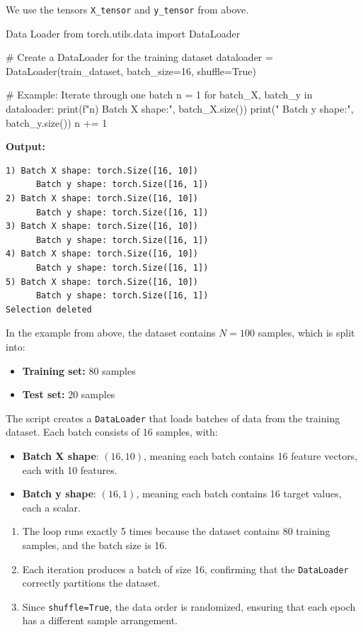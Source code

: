 We use the tensors \texttt{X\_tensor} and \texttt{y\_tensor} from above. 

\begin{codeonly}{Data Loader}
from torch.utils.data import DataLoader

# Create a DataLoader for the training dataset
dataloader = DataLoader(train_dataset, batch_size=16, shuffle=True)

# Example: Iterate through one batch
n = 1
for batch_X, batch_y in dataloader:
    print(f"{n}) Batch X shape:", batch_X.size())
    print("      Batch y shape:", batch_y.size())
    n += 1
\end{codeonly}


\textbf{Output:}
\begin{lstlisting}
1) Batch X shape: torch.Size([16, 10])
      Batch y shape: torch.Size([16, 1])
2) Batch X shape: torch.Size([16, 10])
      Batch y shape: torch.Size([16, 1])
3) Batch X shape: torch.Size([16, 10])
      Batch y shape: torch.Size([16, 1])
4) Batch X shape: torch.Size([16, 10])
      Batch y shape: torch.Size([16, 1])
5) Batch X shape: torch.Size([16, 10])
      Batch y shape: torch.Size([16, 1])
Selection deleted
\end{lstlisting}
%


In the example from above, the dataset contains $N = 100$ samples, which is split into:
\begin{itemize}
    \item \textbf{Training set:} 80 samples
    \item \textbf{Test set:} 20 samples
\end{itemize}
The script creates a \texttt{DataLoader} that loads batches of data from the training dataset. Each batch consists of 16 samples, with:
\begin{itemize}
    \item \textbf{Batch X shape}: $(16,10)$, meaning each batch contains 16 feature vectors, each with 10 features.
    \item \textbf{Batch y shape}: $(16,1)$, meaning each batch contains 16 target values, each a scalar.
\end{itemize}

\begin{enumerate}
    \item The loop runs exactly 5 times because the dataset contains 80 training samples, and the batch size is 16. 
    \item Each iteration produces a batch of size 16, confirming that the \texttt{DataLoader} correctly partitions the dataset.
    \item Since \texttt{shuffle=True}, the data order is randomized, ensuring that each epoch has a different sample arrangement.
\end{enumerate}


